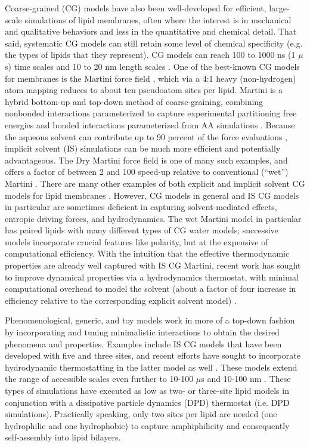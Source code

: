 \documentclass[9pt,bestpractices]{livecoms}
\begin{document}
Coarse-grained (CG) models have also been well-developed for efficient, large-scale simulations of lipid membranes, often where the interest is in mechanical and qualitative behaviors and less in the quantitative and chemical detail.
That said, systematic CG models can still retain some level of chemical specificity (e.g. the types of lipids that they represent).
CG models can reach 100 to 1000 ns (1 $\mu$s) time scales and 10 to 20 nm length scales \cite{Smirnova2015}.
One of the best-known CG models for membranes is the Martini force field \cite{Marrink2004,Marrink2007a}, which via a 4:1 heavy (non-hydrogen) atom mapping reduces to about ten pseudoatom sites per lipid. Martini is a hybrid bottom-up and top-down method of coarse-graining, combining nonbonded interactions parameterized to capture experimental partitioning free energies and bonded interactions parameterized from AA simulations \cite{Marrink2013}.
Because the aqueous solvent can contribute up to 90 percent of the force evaluations \cite{Arnarez2014}, implicit solvent (IS) simulations can be much more efficient and potentially advantageous.
The Dry Martini force field is one of many such examples, and offers a factor of between 2 and 100 speed-up relative to conventional (``wet'') Martini \cite{Arnarez2014}.
There are many other examples of both explicit and implicit solvent CG models for lipid membranes \cite{Ramakrishnan2014c,Brannigan2006}.
However, CG models in general and IS CG models in particular are sometimes deficient in capturing solvent-mediated effects, entropic driving forces, and hydrodynamics.
The wet Martini model in particular has paired lipids with many different types of CG water models; successive models incorporate crucial features like polarity, but at the expensive of computational efficiency.
With the intuition that the effective thermodynamic properties are already well captured with IS CG Martini, recent work has sought to improve dynamical properties via a hydrodynamics thermostat, with minimal computational overhead to model the solvent (about a factor of four increase in efficiency relative to the corresponding explicit solvent model) \cite{Zgorski2016}.

Phenomenological, generic, and toy models work in more of a top-down fashion by incorporating and tuning minimalistic interactions to obtain the desired phenomena and properties.
Examples include IS CG models that have been developed with five \cite{Brannigan2005b} and three \cite{Cooke2005a} sites, and recent efforts have sought to incorporate hydrodynamic thermostatting in the latter model as well \cite{Wang2013}.
These models extend the range of accessible scales even further to 10-100 $\mu$s and 10-100 nm \cite{Smirnova2015}.
These types of simulations have executed as low as two- or three-site lipid models in conjunction with a dissipative particle dynamics (DPD) thermostat (i.e. DPD simulations).
Practically speaking, only two sites per lipid are needed (one hydrophilic and one hydrophobic) to capture amphiphilicity and consequently self-assembly into lipid bilayers.
\end{document}
